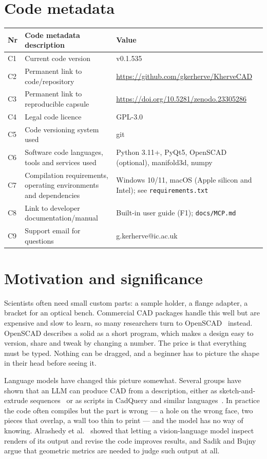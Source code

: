 \documentclass[preprint,12pt]{elsarticle}
\begin{document}
\section*{Code metadata}
\begin{table}[h]
\small
\begin{tabular}{|l|p{6.2cm}|p{6.2cm}|}
\hline
\textbf{Nr} & \textbf{Code metadata description} & \textbf{Value} \\ \hline
C1 & Current code version & v0.1.535~\cite{kherveCADzenodo} \\ \hline
C2 & Permanent link to code/repository & \url{https://github.com/gkerherve/KherveCAD} \\ \hline
C3 & Permanent link to reproducible capsule & \url{https://doi.org/10.5281/zenodo.23305286} \\ \hline
C4 & Legal code licence & GPL-3.0 \\ \hline
C5 & Code versioning system used & git \\ \hline
C6 & Software code languages, tools and services used & Python 3.11+, PyQt5, OpenSCAD (optional), manifold3d, numpy \\ \hline
C7 & Compilation requirements, operating environments and dependencies & Windows 10/11, macOS (Apple silicon and Intel); see \texttt{requirements.txt} \\ \hline
C8 & Link to developer documentation/manual & Built-in user guide (F1); \texttt{docs/MCP.md} \\ \hline
C9 & Support email for questions & g.kerherve@ic.ac.uk \\ \hline
\end{tabular}
\end{table}

\section{Motivation and significance}

Scientists often need small custom parts: a sample holder, a flange adapter, a bracket for an optical bench. Commercial CAD packages handle this well but are expensive and slow to learn, so many researchers turn to OpenSCAD~\cite{openscad} instead. OpenSCAD describes a solid as a short program, which makes a design easy to version, share and tweak by changing a number. The price is that everything must be typed. Nothing can be dragged, and a beginner has to picture the shape in their head before seeing it.

Language models have changed this picture somewhat. Several groups have shown that an LLM can produce CAD from a description, either as sketch-and-extrude sequences~\cite{wu2023cadllm,khan2024text2cad} or as scripts in CadQuery and similar languages~\cite{xie2025textcadquery,guan2025cadcoder}. In practice the code often compiles but the part is wrong --- a hole on the wrong face, two pieces that overlap, a wall too thin to print --- and the model has no way of knowing. Alrashedy et al.~\cite{alrashedy2025cadcodeverify} showed that letting a vision-language model inspect renders of its output and revise the code improves results, and Sadik and Bujny~\cite{sadik2025hitl} argue that geometric metrics are needed to judge such output at all.
\end{document}
